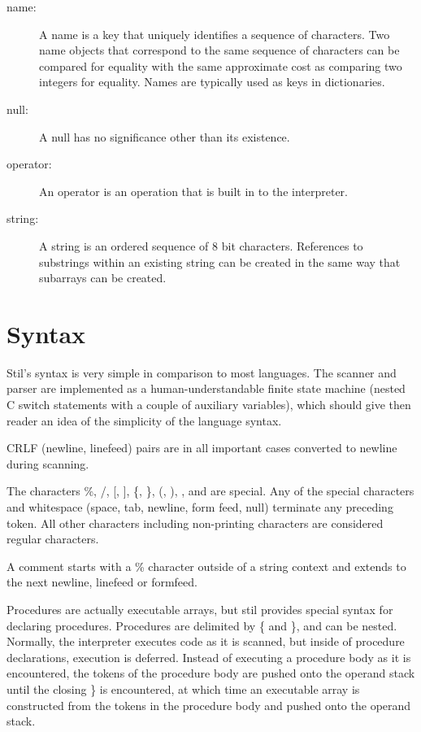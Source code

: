 \begin{description}
\item[name: ] A name is a key that uniquely identifies a sequence of characters.
Two name objects that correspond to the same sequence of characters can be
compared for equality with the same approximate cost as comparing two integers
for equality.  Names are typically used as keys in dictionaries.

\item[null: ] A null has no significance other than its existence.

\item[operator: ] An operator is an operation that is built in to the
interpreter.

\item[string: ] A string is an ordered sequence of 8 bit characters.  References
to substrings within an existing string can be created in the same way that
subarrays can be created.

\end{description}

\section{Syntax}

Stil's syntax is very simple in comparison to most languages.  The scanner and
parser are implemented as a human-understandable finite state machine (nested C
switch statements with a couple of auxiliary variables), which should give then
reader an idea of the simplicity of the language syntax.

CRLF (newline, linefeed) pairs are in all important cases converted to newline
during scanning.

The characters \%, /, [, ], \{, \}, (, ), {\lt}, and {\gt} are special.  Any
of the special characters and whitespace (space, tab, newline, form feed, null)
terminate any preceding token.  All other characters including non-printing
characters are considered regular characters.

A comment starts with a \% character outside of a string context and extends to
the next newline, linefeed or formfeed.

Procedures are actually executable arrays, but stil provides special syntax for
declaring procedures.  Procedures are delimited by \{ and \}, and can be
nested.  Normally, the interpreter executes code as it is scanned, but inside of
procedure declarations, execution is deferred.  Instead of executing a procedure
body as it is encountered, the tokens of the procedure body are pushed onto the
operand stack until the closing \} is encountered, at which time an executable
array is constructed from the tokens in the procedure body and pushed onto the
operand stack.

